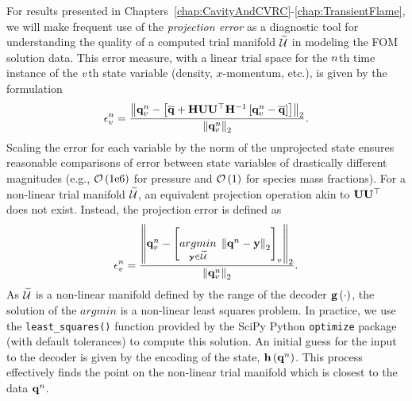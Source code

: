 For results presented in Chapters~\ref{chap:CavityAndCVRC}-\ref{chap:TransientFlame}, we will make frequent use of the \textit{projection error} as a diagnostic tool for understanding the quality of a computed trial manifold $\trialSpace$ in modeling the FOM solution data. This error measure, with a linear trial space for the $n$th time instance of the $v$th state variable (density, $x$-momentum, etc.), is given by the formulation
%
\begin{equation}\label{eq:projErrLinear}
    \errVecVar^\timeIdx = \frac{\left\Vert \stateVecVar^\timeIdx - \left[\stateVecCent + \scaleMat \basisMat \basisMat^\top \scaleMatInv \left[ \stateVecVar^\timeIdx - \stateVecCent \right] \right] \right\Vert_2}{\left\Vert \stateVecVar^\timeIdx \right\Vert_2}.
\end{equation}
%
Scaling the error for each variable by the norm of the unprojected state ensures reasonable comparisons of error between state variables of drastically different magnitudes (e.g., $\mathcal{O}\left(1\text{e}6\right)$ for pressure and $\mathcal{O}\left(1\right)$ for species mass fractions). For a non-linear trial manifold $\trialSpace$, an equivalent projection operation akin to $\basisMat \basisMat^\top$ does not exist. Instead, the projection error is defined as
%
\begin{equation}\label{eq:projErrNonlin}
    \errVecVar^\timeIdx = \frac{\left\Vert \stateVecVar^\timeIdx - \left[ \argmin{\dummyVec \in \trialSpace} \left\Vert \stateVec^\timeIdx - \dummyVec \right\Vert_2 \right]_{\varIdx} \right\Vert_2}{\left\Vert \stateVecVar^\timeIdx \right\Vert_2}.
\end{equation}
%
As $\trialSpace$ is a non-linear manifold defined by the range of the decoder $\mathbf{g} \left(\cdot\right)$, the solution of the $argmin$ is a non-linear least squares problem. In practice, we use the \verb|least_squares()| function provided by the SciPy Python \texttt{optimize} package (with default tolerances) to compute this solution. An initial guess for the input to the decoder is given by the encoding of the state, $\mathbf{h} \left(\mathbf{q}^{n}\right)$. This process effectively finds the point on the non-linear trial manifold which is closest to the data $\mathbf{q}^{n}$.

